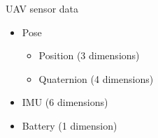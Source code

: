 \begin{frame}[allowframebreaks]{UAV sensor data}
    
    \begin{itemize}
        \item Pose
            \begin{itemize}
                \item Position (3 dimensions)
                \item Quaternion (4 dimensions)
            \end{itemize}
        \item IMU (6 dimensions)
        \item Battery (1 dimension)
    \end{itemize}

\end{frame}